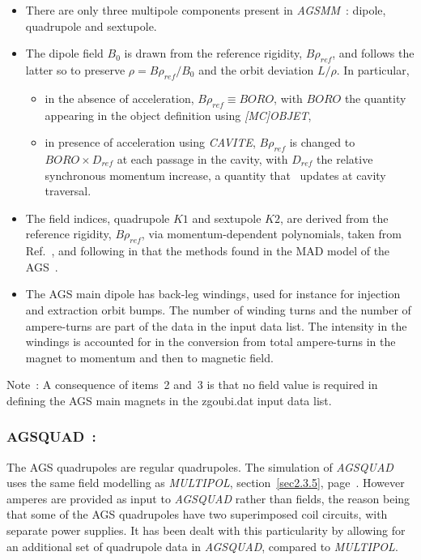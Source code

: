 \begin{itemize}
  \item There are only three multipole components present in \textsl{AGSMM}~: dipole, quadrupole and sextupole. 
  \item The dipole field $B_0$ is drawn from the reference rigidity, $B\rho_{ref}$, and  follows the latter so to preserve 
$\rho = B\rho_{ref} / B_0$  and the orbit deviation  $L/\rho$. In particular, 
  \begin{itemize}
     \item in the absence of acceleration, $B\rho_{ref} \equiv BORO$, with $BORO$ the quantity appearing  in the object definition 
using  \textsl{[MC]OBJET}, 
     \item in presence of acceleration using \textsl{CAVITE}, $B\rho_{ref} $ is changed 
to $ BORO\times D_{ref}$   at each passage in the cavity, with $D_{ref}$ 
the relative synchronous momentum increase, a quantity that \zgou\ updates at cavity traversal.
  \end{itemize}
  \item The field indices, quadrupole $K1$ and sextupole $K2$, are derived from  the reference rigidity, $B\rho_{ref}$, via 
 momentum-dependent polynomials, taken from Ref.~\cite{EJBleser}, 
 and following in that the methods found in the MAD model of the AGS~\cite{MADXAGSModel}. 

  \item The AGS main dipole has back-leg windings, used for instance for injection and extraction orbit bumps. 
The number of winding turns and the  number of ampere-turns 
are part of the data in the input data list. The intensity in the windings is  accounted for in the conversion 
 from total ampere-turns in the magnet  to momentum and then to magnetic field. 
\end{itemize}

\bigskip

  \noindent Note~: A consequence of  items~2 and~3 is that  no field value is required in defining the AGS main magnets in 
the  zgoubi.dat input data list. 




\newpage

\subsubsection*{AGSQUAD~:  \AGSQUADTitl} \label{AGSQUAD}
\medskip 

The AGS quadrupoles are regular quadrupoles. 
The simulation of  \textsl{AGSQUAD}  uses the same field modelling as \textsl{MULTIPOL}, 
section~\ref{sec2.3.5}, page~\pageref{sec2.3.5}.  However amperes are provided as input to 
 \textsl{AGSQUAD} rather than fields, the reason being that 
 some of the AGS quadrupoles  have two superimposed coil circuits, with separate power supplies. 
It has been dealt with this 
particularity by allowing  for an additional set of quadrupole data in \textsl{AGSQUAD}, compared to \textsl{MULTIPOL}. 

